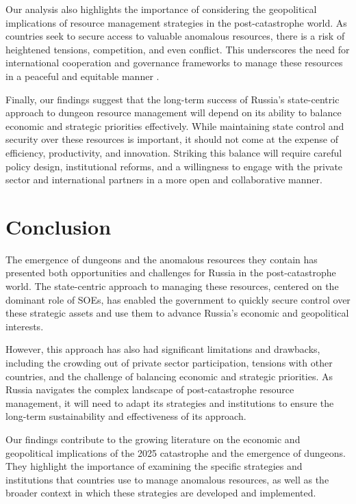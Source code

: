 \documentclass[12pt, a4paper]{article}
\begin{document}
Our analysis also highlights the importance of considering the geopolitical implications of resource management strategies in the post-catastrophe world. As countries seek to secure access to valuable anomalous resources, there is a risk of heightened tensions, competition, and even conflict. This underscores the need for international cooperation and governance frameworks to manage these resources in a peaceful and equitable manner \citep{Acemoglu2012, Sachs2007}.

Finally, our findings suggest that the long-term success of Russia's state-centric approach to dungeon resource management will depend on its ability to balance economic and strategic priorities effectively. While maintaining state control and security over these resources is important, it should not come at the expense of efficiency, productivity, and innovation. Striking this balance will require careful policy design, institutional reforms, and a willingness to engage with the private sector and international partners in a more open and collaborative manner.

\section{Conclusion}
The emergence of dungeons and the anomalous resources they contain has presented both opportunities and challenges for Russia in the post-catastrophe world. The state-centric approach to managing these resources, centered on the dominant role of SOEs, has enabled the government to quickly secure control over these strategic assets and use them to advance Russia's economic and geopolitical interests.

However, this approach has also had significant limitations and drawbacks, including the crowding out of private sector participation, tensions with other countries, and the challenge of balancing economic and strategic priorities. As Russia navigates the complex landscape of post-catastrophe resource management, it will need to adapt its strategies and institutions to ensure the long-term sustainability and effectiveness of its approach.

Our findings contribute to the growing literature on the economic and geopolitical implications of the 2025 catastrophe and the emergence of dungeons. They highlight the importance of examining the specific strategies and institutions that countries use to manage anomalous resources, as well as the broader context in which these strategies are developed and implemented.
\end{document}
